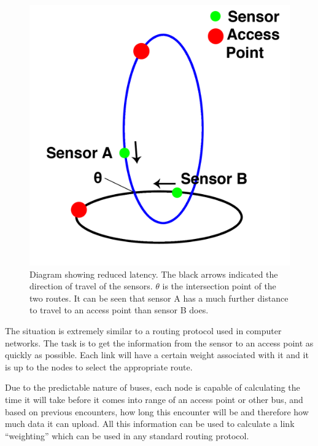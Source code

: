 \begin{figure}[H]
    \begin{center}
        \includegraphics[scale=0.2]{./images/mpp1/Intersection.png}
        \caption{Diagram showing reduced latency. The black arrows indicated the direction of travel of the sensors. $\theta$ is the intersection point of the two routes. It can be seen that sensor A has a much further distance to travel to an access point than sensor B does.}
        \label{fig:opportunisticdiagram}
    \end{center}
\end{figure}

The situation is extremely similar to a routing protocol used in computer networks. The task is to get the information from the sensor to an access point as quickly as possible. Each link will have a certain weight associated with it and it is up to the nodes to select the appropriate route. 

Due to the predictable nature of buses, each node is capable of calculating the time it will take before it comes into range of an access point or other bus, and based on previous encounters, how long this encounter will be and therefore how much data it can upload. All this information can be used to calculate a link ``weighting'' which can be used in any standard routing protocol. 

